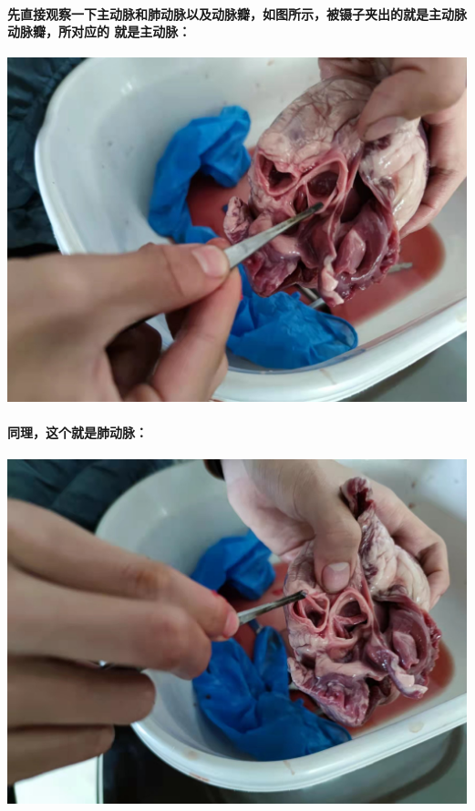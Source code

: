 \documentclass[final,11pt,oneside,UTF8]{report}
\begin{document}
\paragraph{
    先直接观察一下主动脉和肺动脉以及动脉瓣，如图所示，被镊子夹出的就是主动脉动脉瓣，所对应的
    就是主动脉：
}
\begin{center}
    \includegraphics[scale=0.1,angle=0]{photos/main.jpg}
\end{center}
\paragraph{
    同理，这个就是肺动脉：
}
\begin{center}
    \includegraphics[scale=0.1,angle=0]{photos/lung.jpg}
\end{center}
\end{document}
